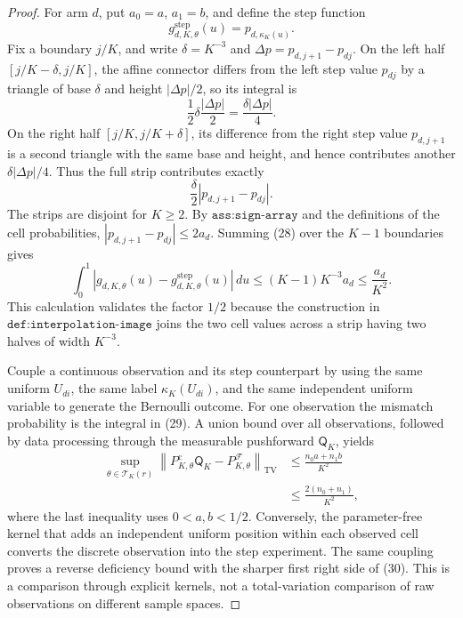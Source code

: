 \documentclass{article}
\begin{document}
\begin{proof}
For arm \(d\), put \(a_0=a\), \(a_1=b\), and define the step function
\[
 g^{\mathrm{step}}_{d,K,\theta}(u)
 =p_{d,\kappa_K(u)}.
\]
Fix a boundary \(j/K\), and write \(\delta=K^{-3}\) and
\(\Delta p=p_{d,j+1}-p_{dj}\).  On the left half
\([j/K-\delta,j/K]\), the affine connector differs from the left step
value \(p_{dj}\) by a triangle of base \(\delta\) and height
\(|\Delta p|/2\), so its integral is
\[
 \frac12\delta\frac{|\Delta p|}{2}
 =\frac{\delta|\Delta p|}{4}.
 \tag{27}
\]
On the right half \([j/K,j/K+\delta]\), its difference from the right
step value \(p_{d,j+1}\) is a second triangle with the same base and
height, and hence contributes another
\(\delta|\Delta p|/4\).  Thus the full strip contributes exactly
\[
 \frac{\delta}{2}|p_{d,j+1}-p_{dj}|.
 \tag{28}
\]
The strips are disjoint for \(K\ge2\).  By
\(\texttt{ass:sign-array}\) and the definitions of the cell
probabilities,
\(|p_{d,j+1}-p_{dj}|\le2a_d\).  Summing (28) over the
\(K-1\) boundaries gives
\[
 \int_0^1
 |g_{d,K,\theta}(u)-g^{\mathrm{step}}_{d,K,\theta}(u)|\,du
 \le (K-1)K^{-3}a_d
 \le\frac{a_d}{K^2}.
 \tag{29}
\]
This calculation validates the factor \(1/2\) because the construction
in \(\texttt{def:interpolation-image}\) joins the two cell values
across a strip having two halves of width \(K^{-3}\).

Couple a continuous observation and its step counterpart by using the
same uniform \(U_{di}\), the same label \(\kappa_K(U_{di})\), and the
same independent uniform variable to generate the Bernoulli outcome.
For one observation the mismatch probability is the integral in (29).
A union bound over all observations, followed by data processing
through the measurable pushforward \(\mathsf Q_K\), yields
\[
\begin{aligned}
 \sup_{\theta\in\mathcal T_K(r)}
 \left\lVert P^{\mathrm c}_{K,\theta}\mathsf Q_K
       -P^{\mathcal F}_{K,\theta}\right\rVert_{\mathrm{TV}}
 &\le\frac{n_0a+n_1b}{K^2}\\
 &\le\frac{2(n_0+n_1)}{K^2},
\end{aligned}
 \tag{30}
\]
where the last inequality uses \(0<a,b<1/2\).  Conversely, the
parameter-free kernel that adds an independent uniform position within
each observed cell converts the discrete observation into the step
experiment.  The same coupling proves a reverse deficiency bound with
the sharper first right side of (30).  This is a comparison through
explicit kernels, not a total-variation comparison of raw observations
on different sample spaces.


\end{proof}
\end{document}
